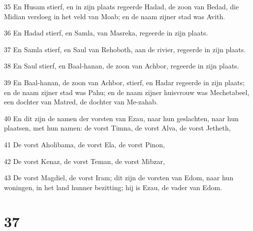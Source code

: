 \par 35 En Husam stierf, en in zijn plaats regeerde Hadad, de zoon van Bedad, die Midian versloeg in het veld van Moab; en de naam zijner stad was Avith.
\par 36 En Hadad stierf, en Samla, van Masreka, regeerde in zijn plaats.
\par 37 En Samla stierf, en Saul van Rehoboth, aan de rivier, regeerde in zijn plaats.
\par 38 En Saul stierf, en Baal-hanan, de zoon van Achbor, regeerde in zijn plaats.
\par 39 En Baal-hanan, de zoon van Achbor, stierf, en Hadar regeerde in zijn plaats; en de naam zijner stad was Pahu; en de naam zijner huisvrouw was Mechetabeel, een dochter van Matred, de dochter van Me-zahab.
\par 40 En dit zijn de namen der vorsten van Ezau, naar hun geslachten, naar hun plaatsen, met hun namen: de vorst Timna, de vorst Alva, de vorst Jetheth,
\par 41 De vorst Aholibama, de vorst Ela, de vorst Pinon,
\par 42 De vorst Kenaz, de vorst Teman, de vorst Mibzar,
\par 43 De vorst Magdiel, de vorst Iram; dit zijn de vorsten van Edom, naar hun woningen, in het land hunner bezitting; hij is Ezau, de vader van Edom.

\chapter{37}

